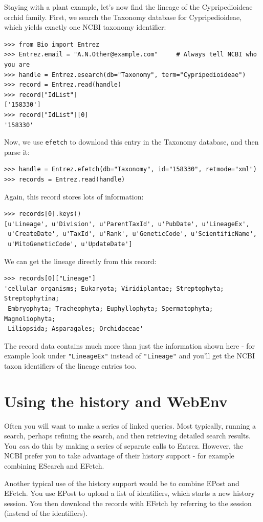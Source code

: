 \documentclass{report}
\begin{document}
Staying with a plant example, let's now find the lineage of the Cypripedioideae orchid family. First, we search the Taxonomy database for Cypripedioideae, which yields exactly one NCBI taxonomy identifier:
\begin{verbatim}
>>> from Bio import Entrez
>>> Entrez.email = "A.N.Other@example.com"     # Always tell NCBI who you are
>>> handle = Entrez.esearch(db="Taxonomy", term="Cypripedioideae")
>>> record = Entrez.read(handle)
>>> record["IdList"]
['158330']
>>> record["IdList"][0]
'158330'
\end{verbatim}
Now, we use \verb+efetch+ to download this entry in the Taxonomy database, and then parse it:
\begin{verbatim}
>>> handle = Entrez.efetch(db="Taxonomy", id="158330", retmode="xml")
>>> records = Entrez.read(handle)
\end{verbatim}
Again, this record stores lots of information:
\begin{verbatim}
>>> records[0].keys()
[u'Lineage', u'Division', u'ParentTaxId', u'PubDate', u'LineageEx',
 u'CreateDate', u'TaxId', u'Rank', u'GeneticCode', u'ScientificName',
 u'MitoGeneticCode', u'UpdateDate']
\end{verbatim}
We can get the lineage directly from this record:
\begin{verbatim}
>>> records[0]["Lineage"]
'cellular organisms; Eukaryota; Viridiplantae; Streptophyta; Streptophytina;
 Embryophyta; Tracheophyta; Euphyllophyta; Spermatophyta; Magnoliophyta;
 Liliopsida; Asparagales; Orchidaceae'
\end{verbatim}

The record data contains much more than just the information shown here - for example look under \texttt{"LineageEx"} instead of \texttt{"Lineage"} and you'll get the NCBI taxon identifiers of the lineage entries too.

\section{Using the history and WebEnv}
\label{sec:entrez-webenv}

Often you will want to make a series of linked queries.  Most typically,
running a search, perhaps refining the search, and then retrieving detailed
search results.  You \emph{can} do this by making a series of separate calls
to Entrez.  However, the NCBI prefer you to take advantage of their history
support - for example combining ESearch and EFetch.

Another typical use of the history support would be to combine EPost and
EFetch.  You use EPost to upload a list of identifiers, which starts a new
history session.  You then download the records with EFetch by referring
to the session (instead of the identifiers).
\end{document}
